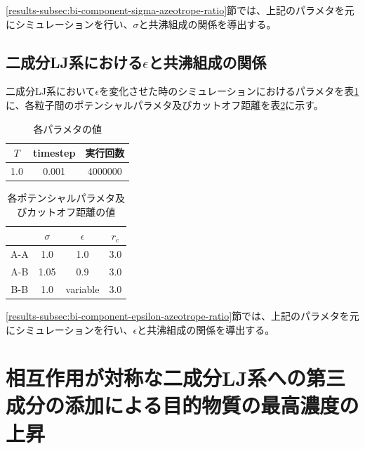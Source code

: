 \documentclass[titlepage]{jsreport}
\begin{document}
\ref{results-subsec:bi-component-sigma-azeotrope-ratio}節では、上記のパラメタを元にシミュレーションを行い、$\sigma$と共沸組成の関係を導出する。


\subsection{二成分LJ系における$\epsilon$と共沸組成の関係} \label{method-subsec:bi-component-epsilon-azeotrope-ratio}
二成分LJ系において${\epsilon}$を変化させた時のシミュレーションにおけるパラメタを表\ref{table:bi-component-epsilon-azeotrope-ratio-parameter}に、各粒子間のポテンシャルパラメタ及びカットオフ距離を表\ref{table:bi-component-epsilon-azeotrope-ratio-potential-parameter}に示す。

\begin{table}[htbp]
    \begin{center}
        \caption{各パラメタの値}
        \label{table:bi-component-epsilon-azeotrope-ratio-parameter}
        \begin{tabular}{c c c}
            $T$ & timestep & 実行回数 \\
            \hline
            1.0 & 0.001 & 4000000 \\
        \end{tabular}
    \end{center}
\end{table}

\begin{table}[htbp]
    \begin{center}
        \caption{各ポテンシャルパラメタ及びカットオフ距離の値}
        \label{table:bi-component-epsilon-azeotrope-ratio-potential-parameter}
        \begin{tabular}{c c c c}
            & $\sigma$ & $\epsilon$ & $r_c$ \\
            \hline
            A-A & 1.0 & 1.0 & 3.0 \\
            A-B & 1.05 & 0.9 & 3.0 \\
            B-B & 1.0 & variable & 3.0
        \end{tabular}
    \end{center}
\end{table}

\ref{results-subsec:bi-component-epsilon-azeotrope-ratio}節では、上記のパラメタを元にシミュレーションを行い、$\epsilon$と共沸組成の関係を導出する。


\section{相互作用が対称な二成分LJ系への第三成分の添加による目的物質の最高濃度の上昇} \label{method-sec:bi-component-addition-of-3rd-component-highest-purity}
\end{document}
